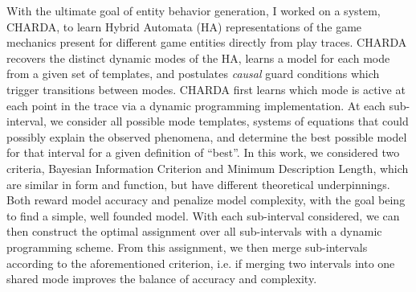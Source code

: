 \documentclass[12pt]{report}
\begin{document}
With the ultimate goal of entity behavior generation, I worked on a system, CHARDA, to learn Hybrid Automata (HA) representations of the game mechanics present for different game entities directly from play traces.   CHARDA recovers the distinct dynamic modes of the HA, learns a model for each mode from a given set of templates, and postulates \textit{causal} guard conditions which trigger transitions between modes. CHARDA first learns which mode is active at each point in the trace via a dynamic programming implementation.  At each sub-interval, we consider all possible mode templates, systems of equations that could possibly explain the observed phenomena, and determine the best possible model for that interval for a given definition of ``best''.  In this work, we considered two criteria, Bayesian Information Criterion and Minimum Description Length, which are similar in form and function, but have different theoretical underpinnings.  Both reward model accuracy and penalize model complexity, with the goal being to find a simple, well founded model.  With each sub-interval considered, we can then construct the optimal assignment over all sub-intervals with a dynamic programming scheme.  From this assignment, we then merge sub-intervals according to the aforementioned criterion, i.e. if merging two intervals into one shared mode improves the balance of accuracy and complexity. 
\end{document}
